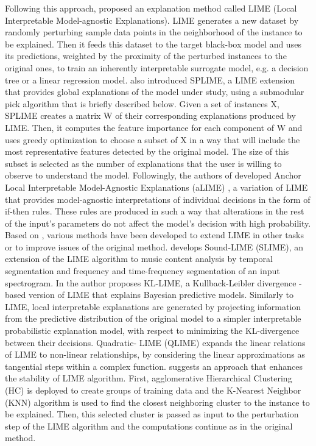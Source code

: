 \documentclass[journal]{IEEEtran}
\begin{document}
Following this approach, \cite{Ribeiro2016} proposed an explanation method called LIME (Local Interpretable Model-agnostic Explanations). LIME generates a new dataset by randomly perturbing sample data points in the neighborhood of the instance to be explained. Then it feeds this dataset to the target black-box model and uses its predictions, weighted by the proximity of the perturbed instances to the original ones, to train an inherently interpretable surrogate model, e.g. a decision tree or a linear regression model. \cite{Ribeiro2016} also introduced SPLIME, a LIME extension that provides global explanations of the model under study, using a submodular pick algorithm that is briefly described below. Given a set of instances X, SPLIME creates a matrix W of their corresponding explanations produced by LIME. Then, it computes the feature importance for each component of W and uses greedy optimization to choose a subset of X in a way that will include the most representative features detected by the original model. The size of this subset is selected as the number of explanations that the user is willing to observe to understand the model. 
Followingly, the authors of \cite{Ribeiro2016} developed Anchor Local Interpretable Model-Agnostic Explanations (aLIME) \cite{Ribeiro2016a}, a variation of LIME that provides model-agnostic interpretations of individual decisions in the form of if-then rules. These rules are produced in such a way that alterations in the rest of the input's parameters do not affect the model's decision with high probability.
Based on \cite{Ribeiro2016}, various methods have been developed to extend LIME in other tasks or to improve issues of the original method.
\cite{Mishra2017} develops Sound-LIME (SLIME), an extension of the LIME algorithm to music content analysis by temporal segmentation and frequency and time-frequency segmentation of an input spectrogram. 
In \cite{Peltola2018} the author proposes KL-LIME, a Kullback-Leibler divergence - based version of LIME that explains Bayesian predictive models. Similarly to LIME, local interpretable explanations are generated by projecting information from the predictive distribution of the original model to a simpler interpretable probabilistic explanation model, with respect to minimizing the KL-divergence between their decisions. 
Quadratic- LIME (QLIME) \cite{Bramhall2020} expands the linear relations of LIME to non-linear relationships, by considering the linear approximations as tangential steps within a complex function. 
\cite{Zafar2019} suggests an approach that enhances the stability of LIME algorithm. First, agglomerative Hierarchical Clustering (HC) is deployed to create groups of training data and the K-Nearest Neighbor (KNN) algorithm is used to find the closest neighboring cluster to the instance to be explained. Then, this selected cluster is passed as input to the perturbation step of the LIME algorithm and the computations continue as in the original method. 
\end{document}
